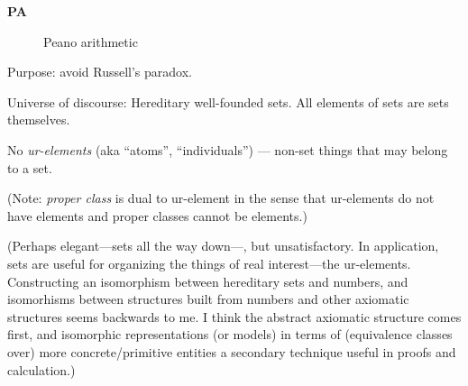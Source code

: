 \setcounter{currentlevel}{\value{baseSectionLevel}}

\begin{description}
\item[\textbf{PA}] Peano arithmetic
\end{description}


\setcounter{currentlevel}{\value{baseSectionLevel}}


Purpose: avoid Russell's paradox\cite{wiki:Russell-paradox}.


Universe of discourse: 
Hereditary well-founded sets.
All elements of sets are sets themselves.

No \textsl{ur-elements}\cite{wiki:Urelement} 
(aka ``atoms'', ``individuals'') ---
non-set things that may belong to a set.

(Note: \textsl{proper class} is dual to ur-element in the sense that
ur-elements do not have elements and proper classes cannot be 
elements.)

(Perhaps elegant---sets all the way down---, but unsatisfactory. 
In application, sets are useful for organizing the things
of real interest---the ur-elements.
Constructing an isomorphism between hereditary sets
and numbers, and isomorhisms between structures built
from numbers and other axiomatic structures seems
backwards to me.
I think the abstract axiomatic structure comes first, 
and isomorphic representations (or models) in terms of 
(equivalence classes over) more concrete/primitive
entities a secondary technique useful in proofs and calculation.)

